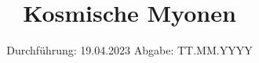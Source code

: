 

\subject{V01}
\title{Kosmische Myonen}
\date{%
  Durchführung: 19.04.2023
  \hspace{3em}
  Abgabe: TT.MM.YYYY
}



\maketitle
\thispagestyle{empty}
\tableofcontents
\newpage







\printbibliography{}


